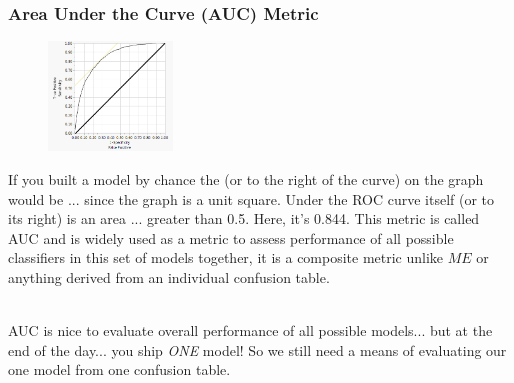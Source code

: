 \documentclass[handout]{beamer}
\begin{document}
\begin{frame}\frametitle{Area Under the Curve (AUC) Metric}

\vspace{-0.2cm}
\begin{figure}
\centering
\hspace{-0.5cm}\includegraphics[width=1.3in]{roc_curve.png}
\end{figure}

\small
\vspace{-0.3cm}
If you built a model by chance the  (or to the right of the curve) on the graph would be ...  since the graph is a unit square. Under the ROC curve itself (or to its right) is an area ... \pause greater than 0.5. Here, it's 0.844. \pause This metric is called AUC and is widely used as a metric to assess performance of all possible classifiers in this set of models together, it is a composite metric unlike $ME$ or anything derived from an individual confusion table.\\~\\ \pause

AUC is nice to evaluate overall performance of all possible models... but at the end of the day... \pause you ship \emph{ONE} model! \pause So we still need a means of evaluating our one model from one confusion table.

\end{frame}
\end{document}
